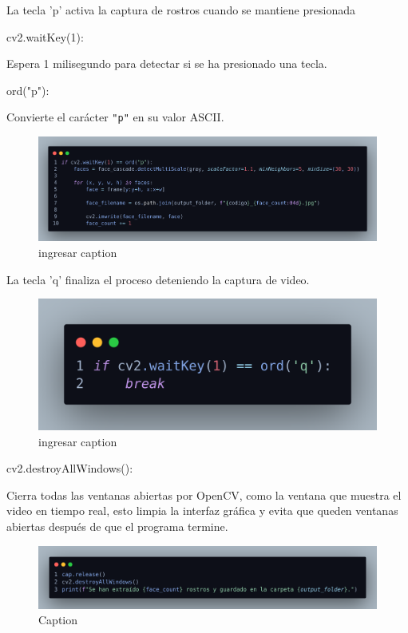 \documentclass[12pt]{article}
\begin{document}
{La tecla 'p' activa la captura de rostros cuando se mantiene presionada 

\begin{itemize}
    {\bfseries\item cv2.waitKey(1):} Espera 1 milisegundo para detectar si se ha presionado una tecla.
    {\bfseries\item ord("p"):} Convierte el carácter \texttt{"p"} en su valor ASCII.
\end{itemize}

\begin{figure}[h]
    \centering
    \includegraphics[width=1.0\linewidth]{imagenes/des13.png}
    \caption{ingresar caption}
    \label{fig:enter-label}
\end{figure}

La tecla 'q' finaliza el proceso deteniendo la captura de video.

\begin{figure}[h]
    \centering
    \includegraphics[width=0.65\linewidth]{imagenes/des14.png}
    \caption{ingresar caption}
    \label{fig:enter-label}
\end{figure}

\begin{itemize}
    {\bfseries\item cv2.destroyAllWindows(): } Cierra todas las ventanas abiertas por OpenCV, como la ventana que muestra el video en tiempo real, esto limpia la interfaz gráfica y evita que queden ventanas abiertas después de que el programa termine.
\end{itemize}

\begin{figure}[h]
    \centering
    \includegraphics[width=1.0\linewidth]{imagenes/des15.png}
    \caption{Caption}
    \label{fig:enter-label}
\end{figure}

}
\end{document}
